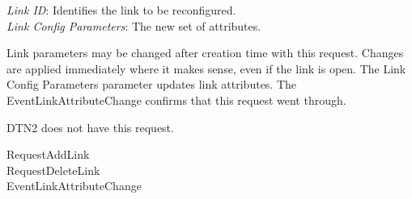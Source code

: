 {
\metP
    {\em Link ID}: Identifies the link to be reconfigured.\\
    {\em Link Config Parameters}: The new set of attributes.

\metD
    Link parameters may be changed after creation time with this
    request. Changes are applied immediately where it makes sense, even if the
    link is open. The Link Config Parameters parameter updates link attributes.
    The EventLinkAttributeChange confirms that this request went through.

\metM
    DTN2 does not have this request.

\metR
    RequestAddLink\\
    RequestDeleteLink\\
    EventLinkAttributeChange
}

